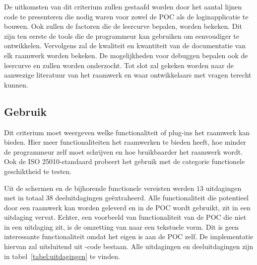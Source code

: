De uitkomsten van dit criterium zullen gestaafd worden door het aantal lijnen code te presenteren die nodig waren voor zowel de POC als de loginapplicatie te bouwen.
Ook zullen de factoren die de leercurve bepalen, worden bekeken. 
Dit zijn ten eerste de tools die de programmeur kan gebruiken om eenvoudiger te ontwikkelen.
Vervolgens zal de kwaliteit en kwantiteit van de documentatie van elk raamwerk worden bekeken.
De mogelijkheden voor debuggen bepalen ook de leercurve en zullen worden onderzocht.
Tot slot zal gekeken worden naar de aanwezige literatuur van het raamwerk en waar ontwikkelaars met vragen terecht kunnen.


\subsection{Gebruik}
\label{sec:vergelijking-gebruik}
Dit criterium moet weergeven welke functionaliteit of plug-ins het raamwerk kan bieden.
Hier meer functionaliteiten het raamwerken te bieden heeft,  hoe minder de programmeur zelf moet schrijven en hoe bruikbaarder het raamwerk wordt.
Ook de ISO 25010-standaard probeert het gebruik met de categorie functionele geschiktheid te testen.

Uit de  schermen en de bijhorende functionele vereisten werden $13$ uitdagingen met in totaal $38$ deeluitdagingen geëxtraheerd.
Alle functionaliteit die potentieel door een raamwerk kan worden geleverd en in de POC wordt gebruikt, zit in een uitdaging vervat.  
Echter, een voorbeeld van functionaliteit van de POC die niet in een uitdaging zit, is de omzetting van  naar een tekstuele vorm.
Dit is geen interessante functionaliteit omdat het eigen is aan de POC zelf.
De implementatie hiervan zal uitsluitend uit \js{}-code bestaan.
Alle uitdagingen en deeluitdagingen zijn in tabel~\ref{tabel:uitdagingen} te vinden.


